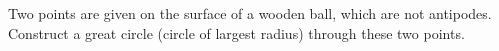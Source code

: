 Two points are given on the surface of a wooden ball, which are not antipodes. Construct a great circle (circle of largest radius) through these two points.
